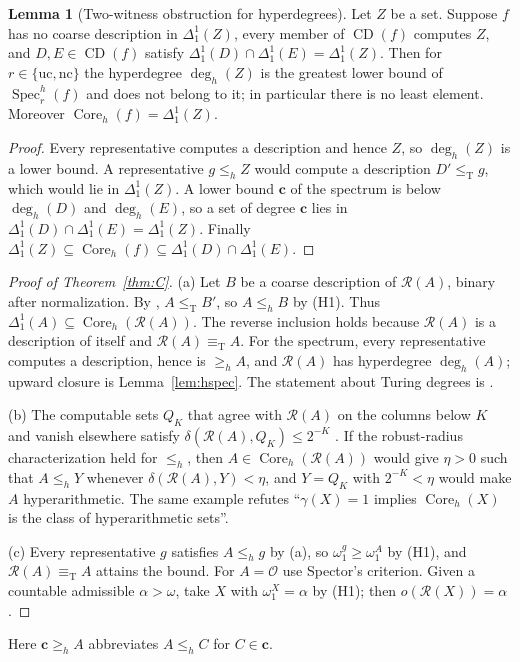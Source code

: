 \documentclass[11pt,letterpaper]{article}
\theoremstyle{definition}
\newtheorem{lemma}[definition]{Lemma}
\numberwithin{equation}{section}
\newcommand{\leT}{\le_{\mathrm T}}
\newcommand{\eqT}{\equiv_{\mathrm T}}
\newcommand{\nc}{\mathrm{nc}}
\newcommand{\uc}{\mathrm{uc}}
\newcommand{\CD}{\operatorname{CD}}
\newcommand{\Rc}{\mathcal R}
\newcommand{\leh}{\le_{h}}
\newcommand{\geh}{\ge_{h}}
\newcommand{\Dh}{\Delta^1_1}
\newcommand{\Coreh}{\operatorname{Core}_h}
\newcommand{\Spech}{\operatorname{Spec}^h}
\newcommand{\degh}{\deg_h}
\newcommand{\KO}{\mathcal O}
\begin{document}
\begin{lemma}[Two-witness obstruction for hyperdegrees]\label{lem:hobstruction}
Let $Z$ be a set. Suppose $f$ has no coarse description in $\Dh(Z)$, every member of $\CD(f)$ computes $Z$, and $D,E\in\CD(f)$ satisfy $\Dh(D)\cap\Dh(E)=\Dh(Z)$. Then for $r\in\{\uc,\nc\}$ the hyperdegree $\degh(Z)$ is the greatest lower bound of $\Spech_r(f)$ and does not belong to it; in particular there is no least element. Moreover $\Coreh(f)=\Dh(Z)$.
\end{lemma}
\begin{proof}
Every representative computes a description and hence $Z$, so $\degh(Z)$ is a lower bound. A representative $g\leh Z$ would compute a description $D'\leT g$, which would lie in $\Dh(Z)$. A lower bound $\mathbf c$ of the spectrum is below $\degh(D)$ and $\degh(E)$, so a set of degree $\mathbf c$ lies in $\Dh(D)\cap\Dh(E)=\Dh(Z)$. Finally $\Dh(Z)\subseteq\Coreh(f)\subseteq\Dh(D)\cap\Dh(E)$.
\end{proof}

\begin{proof}[Proof of Theorem~\ref{thm:C}]
(a) Let $B$ be a coarse description of $\Rc(A)$, binary after normalization. By \cite[Theorem~6.3]{Synthesis}, $A\leT B'$, so $A\leh B$ by (H1). Thus $\Dh(A)\subseteq\Coreh(\Rc(A))$. The reverse inclusion holds because $\Rc(A)$ is a description of itself and $\Rc(A)\eqT A$. For the spectrum, every representative computes a description, hence is $\geh A$, and $\Rc(A)$ has hyperdegree $\degh(A)$; upward closure is Lemma~\ref{lem:hspec}. The statement about Turing degrees is \cite[Theorem~7.4]{Synthesis}.

(b) The computable sets $Q_K$ that agree with $\Rc(A)$ on the columns below $K$ and vanish elsewhere satisfy $\delta(\Rc(A),Q_K)\le2^{-K}$ \cite[Proposition~6.5]{Synthesis}. If the robust-radius characterization held for $\leh$, then $A\in\Coreh(\Rc(A))$ would give $\eta>0$ such that $A\leh Y$ whenever $\delta(\Rc(A),Y)<\eta$, and $Y=Q_K$ with $2^{-K}<\eta$ would make $A$ hyperarithmetic. The same example refutes ``$\gamma(X)=1$ implies $\Coreh(X)$ is the class of hyperarithmetic sets''.

(c) Every representative $g$ satisfies $A\leh g$ by (a), so $\omega_1^g\ge\omega_1^A$ by (H1), and $\Rc(A)\eqT A$ attains the bound. For $A=\KO$ use Spector's criterion. Given a countable admissible $\alpha>\omega$, take $X$ with $\omega_1^X=\alpha$ by (H1); then $o(\Rc(X))=\alpha$.
\end{proof}
\noindent Here $\mathbf c\geh A$ abbreviates $A\leh C$ for $C\in\mathbf c$.
\end{document}
